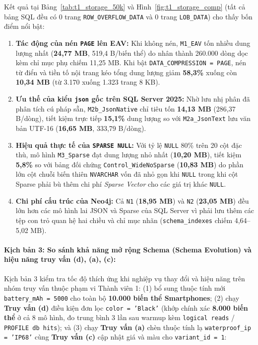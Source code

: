 Kết quả tại Bảng~\ref{tab:t1_storage_50k} và Hình~\ref{fig:t1_storage_comp} (tất cả bảng SQL đều có 0 trang \texttt{ROW\_OVERFLOW\_DATA} và 0 trang \texttt{LOB\_DATA}) cho thấy bốn điểm nổi bật:
\begin{enumerate}
  \item \textbf{Tác động của nén \texttt{PAGE} lên EAV:} Khi không nén, \texttt{M1\_EAV} tốn nhiều dung lượng nhất (\textbf{24,77 MB}, 519,4 B/biến thể) do nhân thành 260.000 dòng dọc kèm chỉ mục phụ chiếm 11,25 MB. Khi bật \texttt{DATA\_COMPRESSION = PAGE}, nén từ điển và tiền tố nội trang kéo tổng dung lượng giảm \textbf{58,3\%} xuống còn \textbf{10,34 MB} (từ 3.170 xuống 1.323 trang 8 KB).
  \item \textbf{Ưu thế của kiểu \texttt{json} gốc trên SQL Server 2025:} Nhờ lưu nhị phân đã phân tích cú pháp sẵn, \texttt{M2b\_JsonNative} chỉ tiêu tốn \textbf{14,13 MB} (286,37 B/dòng), tiết kiệm trực tiếp \textbf{15,1\%} dung lượng so với \texttt{M2a\_JsonText} lưu văn bản UTF-16 (\textbf{16,65 MB}, 333,79 B/dòng).
  \item \textbf{Hiệu quả thực tế của \texttt{SPARSE NULL}:} Với tỷ lệ \texttt{NULL} 80\% trên 20 cột đặc thù, mô hình \texttt{M3\_Sparse} đạt dung lượng nhỏ nhất (\textbf{10,20 MB}), tiết kiệm \textbf{5,8\%} so với bảng đối chứng \texttt{Control\_WideNoSparse} (\textbf{10,83 MB}) do phần lớn cột chuỗi biến thiên \texttt{NVARCHAR} vốn đã nhỏ gọn khi \texttt{NULL} trong khi cột Sparse phải bù thêm chi phí \textit{Sparse Vector} cho các giá trị khác \texttt{NULL}.
  \item \textbf{Chi phí cấu trúc của Neo4j:} Cả \texttt{N1} (\textbf{18,95 MB}) và \texttt{N2} (\textbf{23,05 MB}) đều lớn hơn các mô hình lai JSON và Sparse của SQL Server vì phải lưu thêm các tệp con trỏ quan hệ hai chiều và chỉ mục nhãn (\texttt{schema\_indexes} chiếm 4,64--5,02 MB).
\end{enumerate}

\paragraph{Kịch bản 3: So sánh khả năng mở rộng Schema (Schema Evolution) và hiệu năng truy vấn (d), (a), (c):}
Kịch bản 3 kiểm tra tốc độ thích ứng khi nghiệp vụ thay đổi và hiệu năng trên nhóm truy vấn thuộc phạm vi Thành viên 1: (1) bổ sung thuộc tính mới \texttt{battery\_mAh = 5000} cho toàn bộ \textbf{10.000 biến thể Smartphones}; (2) chạy \textbf{Truy vấn (d)} điều kiện đơn lọc \texttt{color = 'Black'} (khớp chính xác \textbf{8.000 biến thể} ở cả 8 mô hình, đo trung bình 3 lần sau warmup kèm \texttt{logical reads} / \texttt{PROFILE db hits}); và (3) chạy \textbf{Truy vấn (a)} chèn thuộc tính lạ \texttt{waterproof\_ip = 'IP68'} cùng \textbf{Truy vấn (c)} cập nhật giá và màu cho \texttt{variant\_id = 1}:

